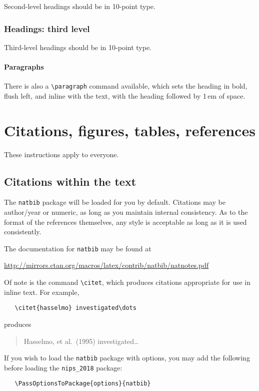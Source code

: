 \documentclass{article}
\begin{document}
Second-level headings should be in 10-point type.

\subsubsection{Headings: third level}

Third-level headings should be in 10-point type.

\paragraph{Paragraphs}

There is also a \verb+\paragraph+ command available, which sets the
heading in bold, flush left, and inline with the text, with the
heading followed by 1\,em of space.

\section{Citations, figures, tables, references}
\label{others}

These instructions apply to everyone.

\subsection{Citations within the text}

The \verb+natbib+ package will be loaded for you by default.
Citations may be author/year or numeric, as long as you maintain
internal consistency.  As to the format of the references themselves,
any style is acceptable as long as it is used consistently.

The documentation for \verb+natbib+ may be found at
\begin{center}
  \url{http://mirrors.ctan.org/macros/latex/contrib/natbib/natnotes.pdf}
\end{center}
Of note is the command \verb+\citet+, which produces citations
appropriate for use in inline text.  For example,
\begin{verbatim}
   \citet{hasselmo} investigated\dots
\end{verbatim}
produces
\begin{quote}
  Hasselmo, et al.\ (1995) investigated\dots
\end{quote}

If you wish to load the \verb+natbib+ package with options, you may
add the following before loading the \verb+nips_2018+ package:
\begin{verbatim}
   \PassOptionsToPackage{options}{natbib}
\end{verbatim}
\end{document}
